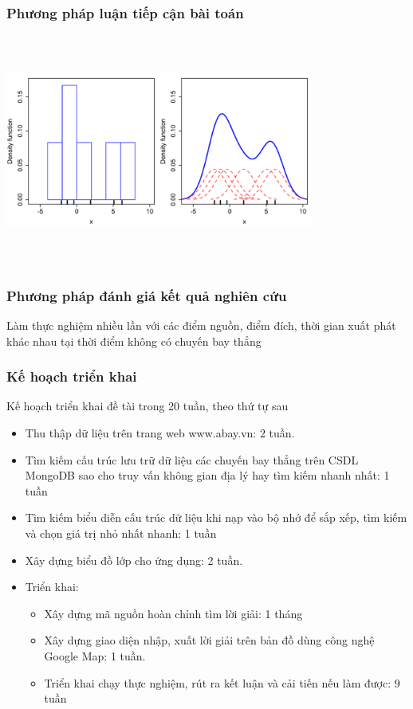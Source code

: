 \documentclass[t]{beamer}
\begin{document}
\begin{frame}
\frametitle{Phương pháp luận tiếp cận bài toán}
\begin{center}
\includegraphics[height=3in,width=4in]{500px-Comparison_of_1D_histogram_and_KDE.png}
\end{center}
\end{frame}

\begin{frame}
\frametitle{Phương pháp đánh giá kết quả nghiên cứu}
Làm thực nghiệm nhiều lần với các điểm nguồn, điểm đích, thời gian xuất phát khác nhau tại thời điểm không có chuyến bay thẳng
\end{frame}


\begin{frame}
\frametitle{Kế hoạch triển khai}
Kế hoạch triển khai đề tài trong 20 tuần,
 theo thứ tự sau

\begin{itemize}
\item Thu thập dữ liệu trên trang web www.abay.vn: 2 tuần.
\item Tìm kiếm cấu trúc lưu trữ dữ liệu các chuyến bay thẳng trên CSDL MongoDB sao cho truy vấn không gian địa lý hay tìm kiếm nhanh nhất: 1 tuần
\item Tìm kiếm biểu diễn cấu trúc dữ liệu khi nạp vào bộ nhớ để sắp xếp, tìm kiếm và chọn giá trị nhỏ nhất nhanh: 1 tuần
\item Xây dựng biểu đồ lớp cho ứng dụng: 2 tuần.
\item Triển khai:
\begin{itemize}
\item Xây dựng mã nguồn hoàn chỉnh tìm lời giải: 1 tháng
\item Xây dựng giao diện nhập, xuất lời giải trên bản đồ dùng công nghệ Google Map: 1 tuần.
\item Triển khai chạy thực nghiệm, rút ra kết luận và cải tiến nếu làm được: 9 tuần
\end{itemize}
\end{itemize}
\end{frame}
\end{document}
